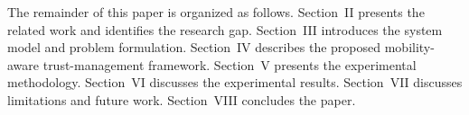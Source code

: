 \documentclass[journal]{IEEEtran}
\begin{document}
The remainder of this paper is organized as follows. Section~II presents the
related work and identifies the research gap. Section~III introduces the
system model and problem formulation. Section~IV describes the proposed
mobility-aware trust-management framework. Section~V presents the experimental
methodology. Section~VI discusses the experimental results. Section~VII
discusses limitations and future work. Section~VIII concludes the paper.


%
%



%
%
\end{document}
